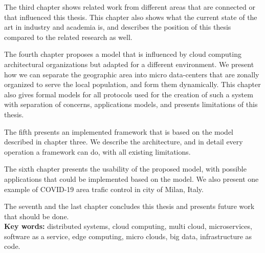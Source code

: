The third chapter shows related work from different areas that are connected or that influenced this thesis. This chapter also shows what the current state of the art in industry and academia is, and describes the position of this thesis compared to the related research as well.

The fourth chapter proposes a model that is influenced by cloud computing architectural organizations but adapted for a different environment. We present how we can separate the geographic area into micro data-centers that are zonally organized to serve the local population, and form them dynamically. This chapter also gives formal models for all protocols used for the creation of such a system with separation of concerns, applications models, and presents limitations of this thesis.

The fifth presents an implemented framework that is based on the model described in chapter three. We describe the architecture, and in detail every operation a framework can do, with all existing limitations.

The sixth chapter presents the usability of the proposed model, with possible applications that could be implemented based on the model. We also present one example of COVID-19 area trafic control in city of Milan, Italy.

The seventh and the last chapter concludes this thesis and presents future work that should be done.\\ 

\noindent
\textbf{Key words:} distributed systems, cloud computing, multi cloud, microservices, software as a service, edge computing, micro clouds, big data, infrastructure as code.